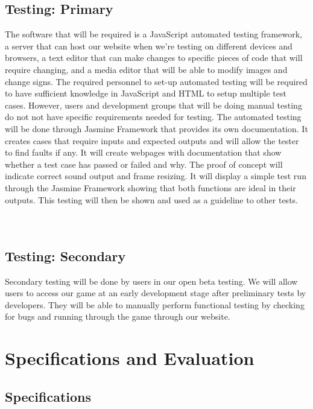 \documentclass[11pt, oneside]{article}   	%
\begin{document}
\subsection{Testing: Primary}
The software that will be required is a JavaScript automated testing framework, a server that can host our website when we're testing on different devices and browsers, a text editor that can make changes to specific pieces of code that will require changing, and a media editor that will be able to modify images and change signs. 
The required personnel to set-up automated testing will be required to have sufficient knowledge in JavaScript and HTML to setup multiple test cases. However, users and development groups that will be doing manual testing do not not have specific requirements needed for testing. 
The automated testing will be done through Jasmine Framework that provides its own documentation. It creates cases that require inputs and expected outputs and will allow the tester to find faults if any. It will create webpages with documentation that show whether a test case has passed or failed and why. 
The proof of concept will indicate correct sound output and frame resizing. It will display a simple test run through the Jasmine Framework showing that both functions are ideal in their outputs. This testing will then be shown and used as a guideline to other tests. 
\\
\\
\\

\subsection{Testing: Secondary}
Secondary testing will be done by users in our open beta testing. We will allow users to access our game at an early development stage after preliminary tests by developers. They will be able to manually perform functional testing by checking for bugs and running through the game through our website. 

\newpage
\section{Specifications and Evaluation}
\subsection{Specifications}
\end{document}

